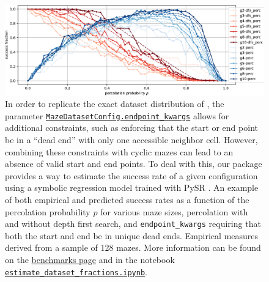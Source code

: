 \begin{figure}
	\centering
	\includegraphics[width=1\textwidth,height=\textheight]{figures/ep/ep_deadends_unique-crop.pdf}
	\caption{
		In order to replicate the exact dataset distribution of \cite{easy_to_hard}, the parameter \href{https://understanding-search.github.io/maze-dataset/maze_dataset/dataset/maze_dataset_config.html#MazeDatasetConfig.endpoint_kwargs}{\texttt{MazeDatasetConfig.endpoint\_kwargs}} allows for additional constraints, such as enforcing that the start or end point be in a ``dead end'' with only one accessible neighbor cell. However, combining these constraints with cyclic mazes can lead to an absence of valid start and end points. To deal with this, our package provides a way to estimate the success rate of a given configuration using a symbolic regression model trained with PySR \cite{pysr}.
		An example of both empirical and predicted success rates as a function of the percolation probability \(p\) for various maze sizes, percolation with and without depth first search, and \texttt{endpoint\_kwargs} requiring that both the start and end be in unique dead ends. Empirical measures derived from a sample of 128 mazes. More information can be found on the \href{https://understanding-search.github.io/maze-dataset/benchmarks/}{benchmarks page} and in the notebook \href{https://understanding-search.github.io/maze-dataset/notebooks/estimate_dataset_fractions.html}{\texttt{estimate\_dataset\_fractions.ipynb}}.
	}
	\label{fig:sre}
\end{figure}